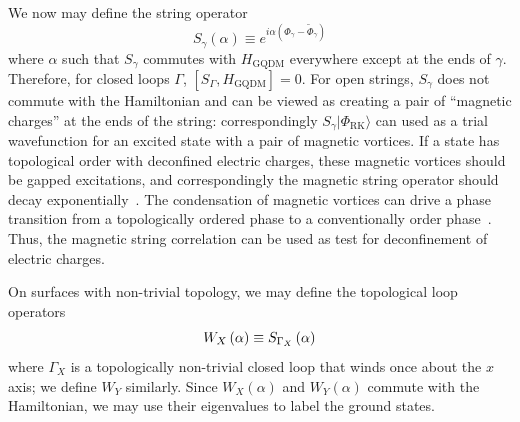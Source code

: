 \documentclass[twocolumn,prb,aps,floatfix,superscriptaddress]{revtex4-1}
\newcommand{\ket}[1]{| #1 \rangle}
\newcommand{\RK}{\mathrm{RK}}
\newcommand{\HGQDM}{H_\mathrm{GQDM}}
\begin{document}
We now may define the string operator
\begin{equation}
S_\gamma \left( \alpha \right) \equiv e^{i \alpha \left( \Phi_\gamma - \tilde{\Phi}_\gamma \right)} \label{eq:Sgamma}
\end{equation}
where $\alpha$ such that $S_\gamma$ commutes with $\HGQDM$ everywhere except at the ends of $\gamma$. Therefore, for closed loops $\Gamma$, $[ S_\Gamma,\HGQDM]=0$. For open strings, $S_\gamma$ does not commute with the Hamiltonian and can be viewed as creating a pair of ``magnetic charges'' at the ends of the string: correspondingly $S_\gamma \ket{\Phi_{\RK}}$ can used as a trial wavefunction for an excited state with a pair of magnetic vortices. If a state has topological order with deconfined electric charges, these magnetic vortices should be gapped excitations, and correspondingly the magnetic string operator should decay exponentially~\cite{Read1989a,Senthil2000,Senthil2001e}. The condensation of magnetic vortices can drive a phase transition from a topologically ordered phase to a conventionally order phase~\cite{Jalabert1991,Ralko2007,Huh2011}. Thus, the magnetic string correlation can be used as test for deconfinement of electric charges.

On surfaces with non-trivial topology, we may define the topological loop operators
\begin{equation}
W_{X} \left( \alpha \right) \equiv S_{\Gamma_{X}} \left( \alpha \right)  \notag
\end{equation}
where $\Gamma_{X}$ is a topologically non-trivial closed loop that winds once about the $x$ axis; we define $W_Y$ similarly. Since $W_{X} (\alpha)$ and $W_{Y} (\alpha)$ commute with the Hamiltonian, we may use their eigenvalues to label the ground states.
\end{document}
